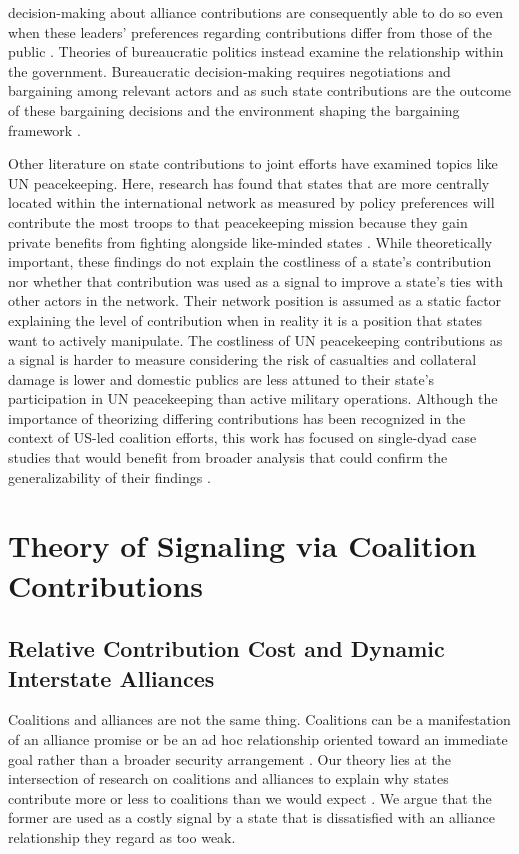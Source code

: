 \documentclass[12pt,letterpaper]{article}
\begin{document}
decision-making about alliance contributions are consequently able to do so even when these leaders' preferences regarding contributions differ from those of the public \citep{saideman_ambivalentcoalitiondoing_2016, vonhlatky_ideologyballotsalliances_2018}. Theories of bureaucratic politics instead examine the relationship within the government. Bureaucratic decision-making requires negotiations and bargaining among relevant actors and as such state contributions are the outcome of these bargaining decisions and the environment shaping the bargaining framework \citep{rathbun_partisaninterventionseuropean_2004, mello_democraticparticipationarmed_2014}.

	Other literature on state contributions to joint efforts have examined topics like UN peacekeeping. Here, research has found that states that are more centrally located within the international network as measured by policy preferences will contribute the most troops to that peacekeeping mission because they gain private benefits from fighting alongside like-minded states \citep{dorussen_networkedinternationalpolitics_2016}. While theoretically important, these findings do not explain the costliness of a state's contribution nor whether that contribution was used as a signal to improve a state's ties with other actors in the network. Their network position is assumed as a static factor explaining the level of contribution when in reality it is a position that states want to actively manipulate. The costliness of UN peacekeeping contributions as a signal is harder to measure considering the risk of casualties and collateral damage is lower and domestic publics are less attuned to their state's participation in UN peacekeeping than active military operations. Although the importance of theorizing differing contributions has been recognized in the context of US-led coalition efforts, this work has focused on single-dyad case studies that would benefit from broader analysis that could confirm the generalizability of their findings \citep{mello_politicsmultinationalmilitary_2018}.

\section{Theory of Signaling via Coalition Contributions}
	\subsection{Relative Contribution Cost and Dynamic Interstate Alliances}
		Coalitions and alliances are not the same thing. Coalitions can be a manifestation of an alliance promise or be an ad hoc relationship oriented toward an immediate goal rather than a broader security arrangement \citep{weitsman_wartimealliancescoalition_2010}. Our theory lies at the intersection of research on coalitions and alliances to explain why states contribute more or less to coalitions than we would expect \citep{saideman_ambivalentcoalitiondoing_2016}. We argue that the former are used as a costly signal by a state that is dissatisfied with an alliance relationship they regard as too weak. 
		
\end{document}
